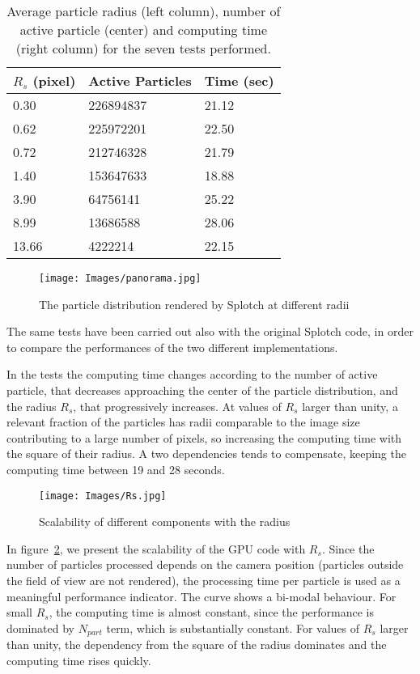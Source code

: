 \documentclass[11pt]{article}
\begin{document}
\begin{table}
\caption{Average particle radius (left column), number of active particle (center)
and computing time (right column) for the seven tests performed.}
\begin{center}
\begin{tabular}{|l|l|l|}
\hline
$R_s$ (pixel) & Active Particles & Time (sec) \\
\hline
0.30   & 226894837  & 21.12 \\
\hline
0.62   & 225972201  & 22.50 \\
\hline
0.72   & 212746328  & 21.79 \\
\hline
1.40   & 153647633  & 18.88 \\
\hline
3.90   & 64756141   & 25.22 \\
\hline
8.99   & 13686588   & 28.06 \\
\hline
13.66  & 4222214    & 22.15 \\
\hline
\end{tabular}
\end{center}
\label{tab:radius}
\end{table}


\begin{figure}
\centering
\texttt{[image: Images/panorama.jpg]}
\caption{The particle distribution rendered by Splotch at different radii}
\label{fig:panorama}
\end{figure}

The same tests have been carried out also with the original Splotch code, in order 
to compare the performances of the two different implementations. 

In the tests the computing time changes according
to the number of active particle, that decreases approaching the center of the particle 
distribution, and the radius $R_s$, that progressively increases. At values of 
$R_s$ larger than unity, a relevant fraction of the particles has radii comparable to the image size
contributing to a large number of pixels, so increasing the computing time 
with the square of their radius. A two dependencies tends to compensate, keeping 
the computing time between 19 and 28 seconds.

\begin{figure}
\centering
\texttt{[image: Images/Rs.jpg]}
\caption{Scalability of different components with the radius}
\label{fig:Rs}
\end{figure}

In figure~\ref{fig:Rs}, we present the scalability of the GPU code 
with $R_s$. Since the number of particles processed depends on
the camera position (particles outside the field of view are not rendered), 
the processing time per particle is used as a meaningful performance
indicator. The curve shows a bi-modal behaviour. For small $R_s$,
the computing time is almost constant, since the performance is dominated
by $N_{part}$ term, which is substantially constant. For values of $R_s$ larger 
than unity, the dependency from the square of the radius dominates and the computing time 
rises quickly. 
\end{document}
